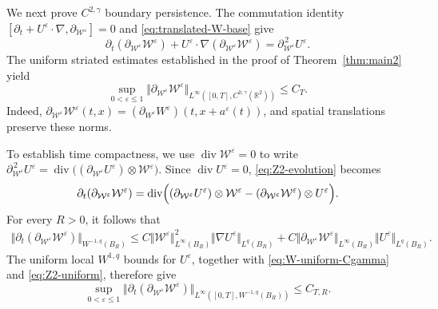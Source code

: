 \documentclass[reqno,11pt,a4paper]{amsart}
\begin{document}
We next prove $C^{2,\gamma}$ boundary persistence.
The commutation identity
$[\partial_t+U^\varepsilon\cdot\nabla, \partial_{\mathcal W^\varepsilon}]=0$
and \eqref{eq:translated-W-base} give
\begin{equation}\label{eq:Z2-evolution}
  \partial_t
    (\partial_{\mathcal W^\varepsilon}\mathcal W^\varepsilon)
  +U^\varepsilon\cdot\nabla
    (\partial_{\mathcal W^\varepsilon}\mathcal W^\varepsilon)
  =
  \partial_{\mathcal W^\varepsilon}^{\,2}U^\varepsilon.
\end{equation}
The uniform striated estimates established
in the proof of Theorem~\ref{thm:main2} yield
\begin{equation}\label{eq:Z2-uniform}
  \sup_{0<\varepsilon\leq1}
  \Vert \partial_{\mathcal W^\varepsilon}\mathcal W^\varepsilon
    \Vert _{L^\infty([0,T],C^{0,\gamma}(\mathbb R^2))}
  \leq C_T.
\end{equation}
Indeed,
$\partial_{\mathcal W^\varepsilon}\mathcal W^\varepsilon(t,x)=
  (\partial_{W^\varepsilon}W^\varepsilon) (t,x+a^\varepsilon(t))$, 
and spatial translations preserve these norms.

To establish time compactness, we use
$\operatorname{div}\mathcal W^\varepsilon=0$ to write
$\partial_{\mathcal W^\varepsilon}^{\,2}U^\varepsilon
  =
  \operatorname{div}\bigl(
    (\partial_{\mathcal W^\varepsilon}U^\varepsilon)
    \otimes\mathcal W^\varepsilon
  \bigr)$.
Since $\operatorname{div}U^\varepsilon=0$,
\eqref{eq:Z2-evolution} becomes
\[
  \partial_t
    (\partial_{\mathcal W^\varepsilon}\mathcal W^\varepsilon)
  =
  \operatorname{div}\Bigl(
    (\partial_{\mathcal W^\varepsilon}U^\varepsilon)
      \otimes\mathcal W^\varepsilon
    -
    (\partial_{\mathcal W^\varepsilon}\mathcal W^\varepsilon)
      \otimes U^\varepsilon
  \Bigr).
\]
For every $R>0$, it follows that
\begin{align*}
  \bigl\Vert 
    \partial_t
    (\partial_{\mathcal W^\varepsilon}\mathcal W^\varepsilon)
  \bigr\Vert _{W^{-1,q}(B_R)}
  \leq
  C\Vert \mathcal W^\varepsilon\Vert _{L^\infty(B_R)}^2
  \Vert \nabla U^\varepsilon\Vert _{L^q(B_R)}
  +  C\Vert \partial_{\mathcal W^\varepsilon}\mathcal W^\varepsilon
    \Vert _{L^\infty(B_R)}
  \Vert U^\varepsilon\Vert _{L^q(B_R)}.
\end{align*}
The uniform local $W^{1,q}$ bounds for $U^\varepsilon$,
together with \eqref{eq:W-uniform-Cgamma}
and \eqref{eq:Z2-uniform}, therefore give
\begin{equation}\label{eq:Z2-time}
  \sup_{0<\varepsilon\leq1}
  \bigl\Vert 
    \partial_t
    (\partial_{\mathcal W^\varepsilon}\mathcal W^\varepsilon)
  \bigr\Vert _{L^\infty([0,T],W^{-1,q}(B_R))}
  \leq C_{T,R}.
\end{equation}
\end{document}
